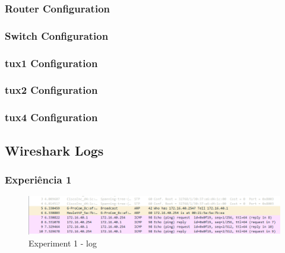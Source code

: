 \documentclass[a4paper]{article}
\begin{document}
	\subsubsection{Router Configuration}
	
	\lstset{title=Anexo 9 - Router Configuration}
	

	\clearpage

	\subsubsection{Switch Configuration}
	
	\lstset{title=Anexo 10 - Switch Configuration}
	

	\clearpage

	\subsubsection{tux1 Configuration}
	
	\lstset{title=Anexo 11 - tux1 Final Configuration}
	

	\subsubsection{tux2 Configuration}
	
	\lstset{title=Anexo 12 - tux2 Final Configuration}
	

	\subsubsection{tux4 Configuration}
	
	\lstset{title=Anexo 13 - tux4 Final Configuration}
	

	\subsection{Wireshark Logs}

	\subsubsection{Experiência 1}

	\begin{figure}[H]
	\begin{center}
  	\includegraphics[width=\linewidth]{exp1_wireshark.png}
  	\caption{Experiment 1 - log}
  	\label{fig:Experiment 1 - log}
	\end{center}
	\end{figure}
\end{document}

